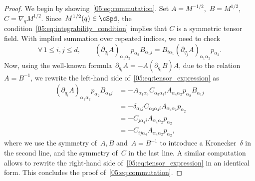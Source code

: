 \begin{proof}
    We begin by showing~\eqref{05:eq:commutation}.
    Set $A = M^{-1/2}$,~$B = M^{1/2}$,~$C=\nabla_q M^{1/2}$. Since~$M^{1/2}(q)\in\cSpd$, the condition~\eqref{05:eq:integrability_condition} implies that $C$ is a symmetric tensor field. With implied summation over repeated indices, we need to check
    \begin{equation}
        \label{05:eq:tensor_expression}
        \forall\,1\leq i,j\leq d,\qquad\left(\partial_{q_i} A\right)_{\alpha_1\alpha_2}p_{\alpha_2} B_{\alpha_1 j} = B_{i\alpha_1}\left(\partial_{q_j}A\right)_{\alpha_1\alpha_2}p_{\alpha_2}.
    \end{equation}
    Now, using the well-known formula~$\partial_{q_i} A= - A \left(\partial_{q_i} B\right) A$, due to the relation~$A=B^{-1}$, we rewrite the left-hand side of~\eqref{05:eq:tensor_expression} as
    \begin{equation}
        \label{05:eq:tensor_expression_transform}
        \begin{aligned}
        \left(\partial_{q_i} A\right)_{\alpha_1\alpha_2}p_{\alpha_2} B_{\alpha_1 j} &= -A_{\alpha_1\alpha_3}C_{\alpha_3\alpha_4 i}A_{\alpha_4 \alpha_2}p_{\alpha_2} B_{\alpha_1 j}\\
        &=-\delta_{\alpha_3 j}C_{\alpha_3\alpha_4 i}A_{\alpha_4\alpha_2}p_{\alpha_2}\\
        &=-C_{j\alpha_4 i}A_{\alpha_4\alpha_2}p_{\alpha_2}\\
        &=-C_{ij\alpha_4}A_{\alpha_4\alpha_2}p_{\alpha_2},
        \end{aligned}
    \end{equation}
    where we use the symmetry of~$A,B$ and~$A=B^{-1}$ to introduce a Kronecker~$\delta$ in the second line, and the symmetry of~$C$ in the last line.
    A similar computation allows to rewrite the right-hand side of~\eqref{05:eq:tensor_expression} in an identical form. This concludes the proof of~\eqref{05:eq:commutation}.


\end{proof}
